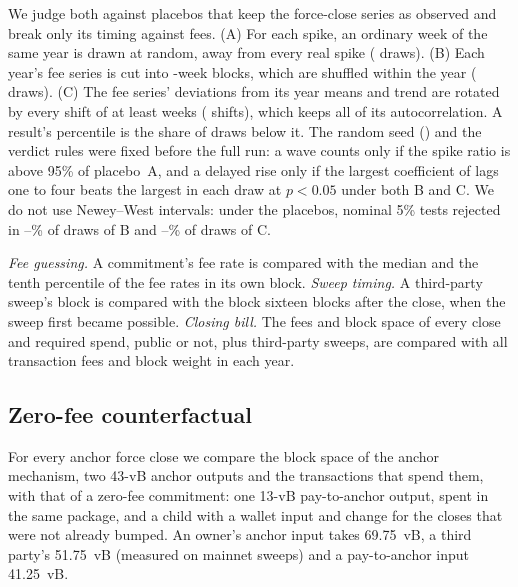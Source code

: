We judge both against placebos that keep the force-close series as observed and break only its timing against fees.
(A) For each spike, an ordinary week of the same year is drawn at random, away from every real spike
(\PlWeekDraws{} draws). (B) Each year's fee series is cut into \PlBlockWeeks-week blocks, which are shuffled within the
year (\PlBlockDraws{} draws). (C) The fee series' deviations from its year means and trend are rotated by every shift of
at least \PlMinShift{} weeks (\PlShifts{} shifts), which keeps all of its autocorrelation. A result's percentile is the
share of draws below it. The random seed (\PlSeed) and the verdict rules were fixed before the full run: a wave counts
only if the spike ratio is above 95\% of placebo~A, and a delayed rise only if the largest coefficient of lags one to
four beats the largest in each draw at $p<0.05$ under both B and C. We do not use Newey--West intervals: under the
placebos, nominal 5\% tests rejected in \PlNwRejectBlockMin--\PlNwRejectBlockMax\% of draws of B and
\PlNwRejectCircMin--\PlNwRejectCircMax\% of draws of C.

\emph{Fee guessing.} A commitment's fee rate is compared with the median and the tenth percentile of the fee rates in
its own block. \emph{Sweep timing.} A third-party sweep's block is compared with the block sixteen blocks after the
close, when the sweep first became possible. \emph{Closing bill.} The fees and block space of every close and required
spend, public or not, plus third-party sweeps, are compared with all transaction fees and block weight in each year.

\subsection{Zero-fee counterfactual}
For every anchor force close we compare the block space of the anchor mechanism, two 43-vB anchor outputs and the
transactions that spend them, with that of a zero-fee commitment: one 13-vB pay-to-anchor output, spent in the same
package, and a child with a wallet input and change for the closes that were not already bumped. An owner's anchor
input takes 69.75~vB, a third party's 51.75~vB (measured on mainnet sweeps) and a pay-to-anchor input 41.25~vB.
